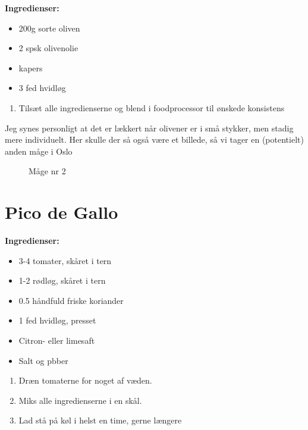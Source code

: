\documentclass{book}
\begin{document}
\begin{minipage}[t]{0.5\textwidth}
\textbf{Ingredienser:}
\begin{itemize}
    \item 200g sorte oliven
    \item 2 spsk olivenolie
    \item kapers
    \item 3 fed hvidløg
\end{itemize}
\end{minipage}
\begin{minipage}[t]{0.5\textwidth}
\begin{enumerate}
    \item Tilsæt alle ingredienserne og blend i foodprocessor til ønskede konsistens
\end{enumerate}
\end{minipage}
Jeg synes personligt at det er lækkert når olivener er i små stykker, men stadig mere individuelt.
\newpage Her skulle der så også være et billede, så vi tager en (potentielt) anden måge i Oslo
\begin{figure}
    \centering
    \caption{Måge nr 2}
\end{figure}
\newpage \section{Pico de Gallo}
\begin{minipage}[t]{0.5\textwidth}
\textbf{Ingredienser:}
\begin{itemize}
    \item 3-4 tomater, skåret i tern
    \item 1-2 rødløg, skåret i tern
    \item 0.5 håndfuld friske koriander
    \item 1 fed hvidløg, presset
    \item Citron- eller limesaft
    \item Salt og pbber
\end{itemize}
\end{minipage}
\begin{minipage}[t]{0.5\textwidth}
\begin{enumerate}
    \item Dræn tomaterne for noget af væden.
    \item Miks alle ingredienserne i en skål.
    \item Lad stå på køl i helst en time, gerne længere
\end{enumerate}
\end{minipage}
\end{document}
